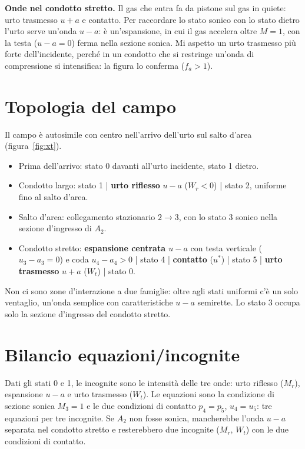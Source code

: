 \documentclass[11pt,a4paper]{article}
\newcommand{\uma}{u-a}
\newcommand{\upa}{u+a}
\newcommand{\Mr}{M_{r}}
\newcommand{\fa}{f_a}
\begin{document}
\textbf{Onde nel condotto stretto.} Il gas che entra fa da pistone sul gas in quiete: urto trasmesso $\upa$ e
contatto. Per raccordare lo stato sonico con lo stato dietro l'urto serve un'onda $\uma$: è un'espansione,
in cui il gas accelera oltre $M=1$, con la testa ($u-a=0$) ferma nella sezione sonica. Mi aspetto un urto
trasmesso più forte dell'incidente, perché in un condotto che si restringe un'onda di compressione si
intensifica: la figura lo conferma ($\fa>1$).

\section{Topologia del campo}
Il campo è autosimile con centro nell'arrivo dell'urto sul salto d'area (figura~\ref{fig:xt}).
\begin{itemize}
  \item Prima dell'arrivo: stato 0 davanti all'urto incidente, stato 1 dietro.
  \item Condotto largo: stato 1 | \textbf{urto riflesso} $\uma$ ($W_r<0$) | stato 2, uniforme fino al salto d'area.
  \item Salto d'area: collegamento stazionario $2\to3$, con lo stato 3 sonico nella sezione d'ingresso di $A_2$.
  \item Condotto stretto: \textbf{espansione centrata $\uma$} con testa verticale ($u_3-a_3=0$) e coda
    $u_4-a_4>0$ | stato 4 | \textbf{contatto} ($u^*$) | stato 5 | \textbf{urto trasmesso} $\upa$ ($W_t$) |
    stato 0.
\end{itemize}
Non ci sono zone d'interazione a due famiglie: oltre agli stati uniformi c'è un solo ventaglio, un'onda
semplice con caratteristiche $\uma$ semirette. Lo stato 3 occupa solo la sezione d'ingresso del condotto
stretto.

\section{Bilancio equazioni/incognite}
Dati gli stati 0 e 1, le incognite sono le intensità delle tre onde: urto riflesso ($\Mr$), espansione $\uma$
e urto trasmesso ($W_t$). Le equazioni sono la condizione di sezione sonica $M_3=1$ e le due condizioni di
contatto $p_4=p_5$, $u_4=u_5$: tre equazioni per tre incognite. Se $A_2$ non fosse sonica, mancherebbe l'onda
$\uma$ separata nel condotto stretto e resterebbero due incognite ($\Mr$, $W_t$) con le due condizioni di
contatto.
\end{document}
